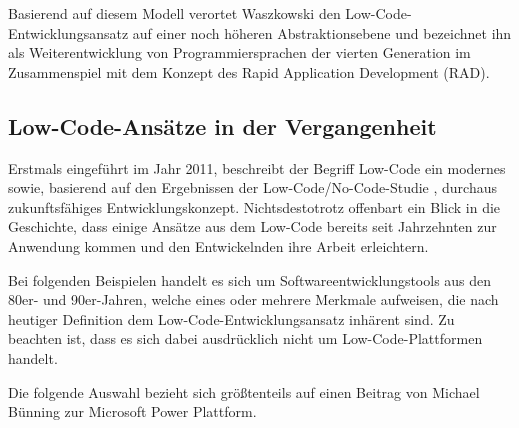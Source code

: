 \documentclass[acmtog, language=ngerman]{acmart}
\begin{document}
Basierend auf diesem Modell verortet Waszkowski den Low-Code-Entwicklungsansatz auf einer noch höheren Abstraktionsebene und bezeichnet ihn als Weiterentwicklung von Programmiersprachen der vierten Generation im Zusammenspiel mit dem Konzept des Rapid Application Development (RAD). \cite{waszkowski_2019}

\subsection{Low-Code-Ansätze in der Vergangenheit}
Erstmals eingeführt im Jahr 2011, beschreibt der Begriff Low-Code ein modernes sowie, basierend auf den Ergebnissen der Low-Code/No-Code-Studie \cite{studie_low_code}, durchaus zukunftsfähiges Entwicklungskonzept. Nichtsdestotrotz offenbart ein Blick in die Geschichte, dass einige Ansätze aus dem Low-Code bereits seit Jahrzehnten zur Anwendung kommen und den Entwickelnden ihre Arbeit erleichtern.

Bei folgenden Beispielen handelt es sich um Softwareentwicklungstools aus den 80er- und 90er-Jahren, welche eines oder mehrere Merkmale aufweisen, die nach heutiger Definition dem Low-Code-Entwicklungsansatz inhärent sind. Zu beachten ist, dass es sich dabei ausdrücklich nicht um Low-Code-Plattformen handelt.

Die folgende Auswahl bezieht sich größtenteils auf einen Beitrag von Michael Bünning zur Microsoft Power Plattform. \cite{microsoft_power_platform}
\end{document}
